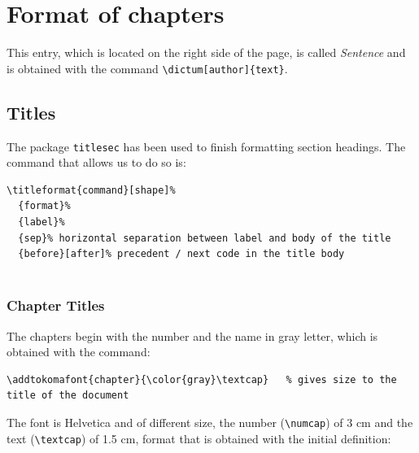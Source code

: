 \documentclass[a4paper,
                             twoside,
                             BCOR=1.0cm,
                             DIV=11,
                             parskip=full,
                             11pt]{scrbook}
\begin{document}
\title{}
\author{
    \\http://catalatex.blogspot.com/
}
\date{\today}

\maketitle
\tableofcontents

\chapter{Format of chapters}\label{cap:primer}

This entry, which is located on the right side of the page, is called \textit {Sentence} and is obtained with the command
\verb+\dictum[author]{text}+.
\section{Titles}\label{sec:titles}
The package \verb+titlesec+ has been used to finish formatting section headings. The command that allows us to do so is:
\begin{scriptsize}
    \begin{verbatim}
\titleformat{command}[shape]%
  {format}%
  {label}%
  {sep}% horizontal separation between label and body of the title
  {before}[after]% precedent / next code in the title body
 

\end{verbatim}
\end{scriptsize}

\subsection{Chapter Titles}\label{sbsec:captit}
The chapters begin with the number and the name in gray letter, which is obtained with the command:
\begin{scriptsize}
    \begin{verbatim}
\addtokomafont{chapter}{\color{gray}\textcap}   % gives size to the title of the document
\end{verbatim}
\end{scriptsize}
The font is Helvetica and of different size, the number (\verb+\numcap+) of 3 cm and the text (\verb+\textcap+) of 1.5 cm, format that is obtained with the initial definition:
\end{document}
